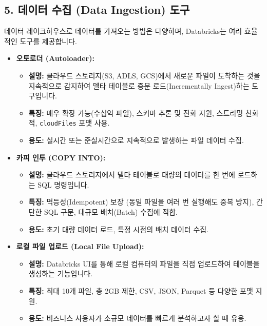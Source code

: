\documentclass[11pt,a4paper]{article}
\begin{document}
\subsection*{5. 데이터 수집 (Data Ingestion) 도구}

데이터 레이크하우스로 데이터를 가져오는 방법은 다양하며, Databricks는 여러 효율적인 도구를 제공합니다.

\begin{tcolorbox}[title=\textbf{Databricks 데이터 수집 도구}, colback=lime!5!white, colframe=lime!75!black, sharp corners, boxrule=0.8pt]
\begin{itemize}
    \item \textbf{오토로더 (Autoloader):}
    \begin{itemize}
        \item \textbf{설명:} 클라우드 스토리지(S3, ADLS, GCS)에서 새로운 파일이 도착하는 것을 지속적으로 감지하여 델타 테이블로 증분 로드(Incrementally Ingest)하는 도구입니다.
        \item \textbf{특징:} 매우 확장 가능(수십억 파일), 스키마 추론 및 진화 지원, 스트리밍 친화적, \texttt{cloudFiles} 포맷 사용.
        \item \textbf{용도:} 실시간 또는 준실시간으로 지속적으로 발생하는 파일 데이터 수집.
    \end{itemize}
    \item \textbf{카피 인투 (COPY INTO):}
    \begin{itemize}
        \item \textbf{설명:} 클라우드 스토리지에서 델타 테이블로 대량의 데이터를 한 번에 로드하는 SQL 명령입니다.
        \item \textbf{특징:} 멱등성(Idempotent) 보장 (동일 파일을 여러 번 실행해도 중복 방지), 간단한 SQL 구문, 대규모 배치(Batch) 수집에 적합.
        \item \textbf{용도:} 초기 대량 데이터 로드, 특정 시점의 배치 데이터 수집.
    \end{itemize}
    \item \textbf{로컬 파일 업로드 (Local File Upload):}
    \begin{itemize}
        \item \textbf{설명:} Databricks UI를 통해 로컬 컴퓨터의 파일을 직접 업로드하여 테이블을 생성하는 기능입니다.
        \item \textbf{특징:} 최대 10개 파일, 총 2GB 제한, CSV, JSON, Parquet 등 다양한 포맷 지원.
        \item \textbf{용도:} 비즈니스 사용자가 소규모 데이터를 빠르게 분석하고자 할 때 유용.
    \end{itemize}

\end{itemize}
\end{tcolorbox}
\end{document}
